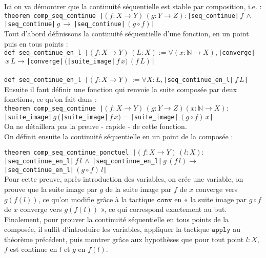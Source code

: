Ici on va démontrer que la continuité séquentielle est stable par composition, i.e. : \\
\texttt{theorem comp_seq_continue |$(f : X \to Y) \,(g : Y \to Z) :$|seq_continue|$\, f \, \land \, $|seq_continue|$ \, g \, \to \,$|seq_continue|$ \, (g \circ f)$|} \\
Tout d'abord définissons la continuité séquentielle d'une fonction, en un point puis en tous points : \\
\texttt{def seq_continue_en_l |$(f : X \to Y) \,(L : X) := \forall (x:\mathbb{N}\to X),$|converge|$ \, x \, L \to$|converge|$ \, ($|suite_image|$ \, f \, x)\, (f \, L)$|} \\ 
\\
\texttt{def seq_continue_en_l |$(f : X \to Y) \, := \forall X : L,$|seq_continue_en_l|$ \, f \, L$|}\\

Ensuite il faut définir une fonction qui renvoie la suite composée par deux fonctions, ce qu'on fait dans : \\
\texttt{theorem comp_seq_continue |$(f : X \to Y) \,(g : Y \to Z)(x : \mathbb{N} \to X) :$|suite_image|$\, g \, ($|suite_image|$ \, f \,x) = $|suite_image|$ \, (g \circ f) \, x$|} \\
On ne détaillera pas la preuve - rapide - de cette fonction.\\
On définit ensuite la continuité séquentielle en un point de la composée : 

\texttt{theorem comp_seq_continue_ponctuel |$(f : X \to Y) \,(l : X) :$|seq_continue_en_l|$\, f \, l \, \land \, $|seq_continue_en_l|$ \, g \, (f \, l) \to \,$|seq_continue_en_l|$ \, (g \circ f) \, l$|} \\

Pour cette preuve, après introduction des variables, on crée une variable, on prouve que la suite image par $g$ de la suite image par $f$ de $x$ converge vers $g(f(l))$, ce qu'on modifie grâce à la tactique $\texttt{conv}$ en « la suite image par $g \circ f$ de $x$ converge vers $g(f(l))$ », ce qui correspond exactement au but.\\

Finalement, pour prouver la continuité séquentielle en tous points de la composée, il suffit d'introduire les variables, appliquer la tactique $\texttt{apply}$ au théorème précédent, puis montrer grâce aux hypothèses que pour tout point $l:X$, $f$ est continue en $l$ et $g$ en $f(l)$.\\
